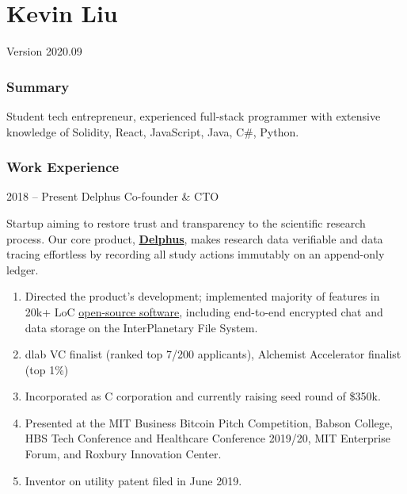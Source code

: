 \documentclass[paper=letter]{tccv}
\begin{document}
\part{Kevin Liu}


Version 2020.09

\section{Summary}

Student tech entrepreneur, experienced full-stack programmer with extensive knowledge of Solidity, React, JavaScript, Java, C\#, Python.

\section{Work Experience}

\begin{eventlist}

\item{2018 -- Present}
     {Delphus}
     {Co-founder \& CTO}

Startup aiming to restore trust and transparency to the scientific research process. Our core product, \href{https://delph.us}{\textbf{Delphus}}, makes research data verifiable and data tracing effortless by recording all study actions immutably on an append-only ledger.

\end{eventlist}

\vspace{-0.5cm}
\begin{enumerate}
     \item Directed the product's development; implemented majority of features in 20k+ LoC \href{https://gitlab.scintillating.us/scintillating/delphus}{open-source software}, including end-to-end encrypted chat and data storage on the InterPlanetary File System.
     \item dlab VC finalist (ranked top 7/200 applicants), Alchemist Accelerator finalist (top 1\%)
     \item Incorporated as C corporation and currently raising seed round of \$350k.
     \item Presented at the MIT Business Bitcoin Pitch Competition, Babson College, HBS Tech Conference and Healthcare Conference 2019/20, MIT Enterprise Forum, and Roxbury Innovation Center.
     \item Inventor on utility patent filed in June 2019.
\end{enumerate}
\end{document}
